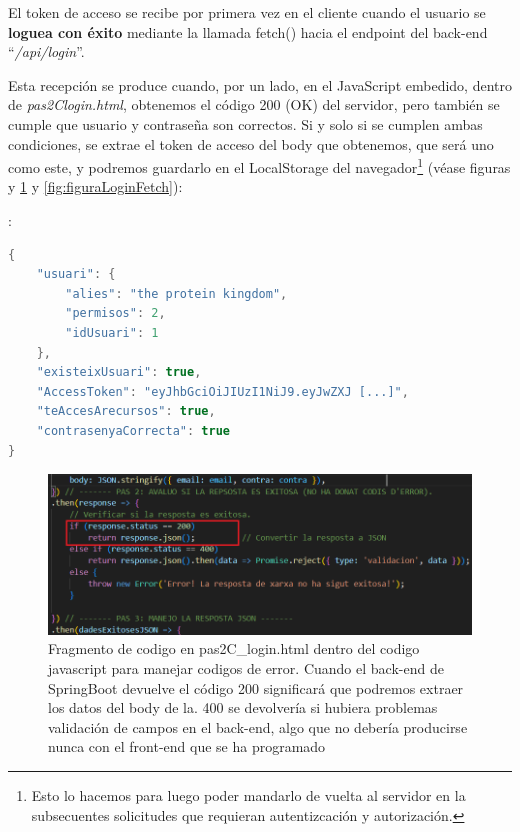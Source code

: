 \documentclass[a4paper,12pt]{report}
\begin{document}
			El token de acceso se recibe por primera vez en el cliente cuando el usuario se \textbf{loguea con éxito} mediante la llamada fetch() hacia el endpoint del back-end ``\textit{/api/login}''. 
			
			Esta recepción se produce cuando, por un lado, en el JavaScript embedido, dentro de \textit{pas2Clogin.html}, obtenemos el código 200 (OK) del servidor, pero también se cumple que usuario y contraseña son correctos. Si y solo si se cumplen ambas condiciones, se extrae el token de acceso del body que obtenemos, que será uno como este, y podremos guardarlo en el LocalStorage del navegador\footnote{Esto lo hacemos para luego poder mandarlo de vuelta al servidor en la subsecuentes solicitudes que requieran autentizcación y autorización.} (véase figuras y \ref{fig:FetchCodisResponseFRONT} y \ref{fig:figuraLoginFetch}):
			
			:
			
\begin{lstlisting}[language=Java, basicstyle=\ttfamily\footnotesize, keywordstyle=\color{magenta}]
{
	"usuari": {
		"alies": "the protein kingdom",
		"permisos": 2,
		"idUsuari": 1
	},
	"existeixUsuari": true,
	"AccessToken": "eyJhbGciOiJIUzI1NiJ9.eyJwZXJ [...]",
	"teAccesArecursos": true,
	"contrasenyaCorrecta": true
}
\end{lstlisting}
			

			
			\setlength{\belowcaptionskip}{3pt}
			\FloatBarrier
			\begin{figure}[H]
				\centering
				\caption{Fragmento de codigo en pas2C\_login.html dentro del codigo javascript para manejar codigos de error. Cuando el back-end de SpringBoot devuelve el código 200 significará que podremos extraer los datos del body de la. 400 se devolvería si hubiera problemas validación de campos en el back-end,  algo que no debería producirse nunca con el front-end que se ha programado}
				\includegraphics[width=1\textwidth]{img/FetchCodisResponseFRONT.png}
				
				\label{fig:FetchCodisResponseFRONT} 
			\end{figure}
			\FloatBarrier
			
\end{document}
